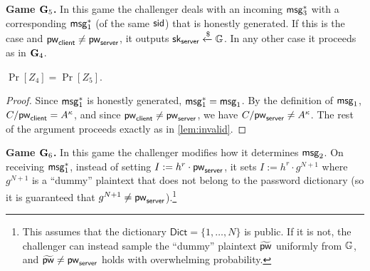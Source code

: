 \textbf{Game $\mathbf{G}_5$.} In this game the challenger deals with an incoming $\mathsf{msg}_{3}^{*}$ with a corresponding $\mathsf{msg}_{1}^{*}$ (of the same $\mathsf{sid}$) that is honestly generated. If this is the case and $\mathsf{pw}_{\mathsf{client}} \neq \mathsf{pw}_{\mathsf{server}}$, it outputs $\mathsf{sk}_{\mathsf{server}}\xleftarrow{\$}\mathbb{G}$. In any other case it proceeds as in $\mathbf{G}_4$.

\begin{lemma}
	$\Pr[Z_4]=\Pr[Z_5]$.
\end{lemma}
\begin{proof}
Since $\mathsf{msg}_{1}^*$ is honestly generated, $\mathsf{msg}_{1}^* = \mathsf{msg}_{1}$. By the definition of $\mathsf{msg}_{1}$, $C/\mathsf{pw}_{\mathsf{client}} = A^\kappa$, and since $\mathsf{pw}_{\mathsf{client}} \neq \mathsf{pw}_{\mathsf{server}}$, we have $C/\mathsf{pw}_{\mathsf{server}} \neq A^\kappa$. The rest of the argument proceeds exactly as in \cref{lem:invalid}. 
\end{proof}

\textbf{Game $\mathbf{G}_6$.} In this game the challenger modifies how it determines $\mathsf{msg}_{2}$. On receiving $\mathsf{msg}_{1}^{*}$, instead of setting $I:=h^r\cdot \mathsf{pw}_{\mathsf{server}}$, it sets $I:=h^r\cdot g^{N+1}$ where $g^{N+1}$ is a ``dummy'' plaintext that does not belong to the password dictionary (so it is guaranteed that $g^{N+1} \neq \mathsf{pw}_{\mathsf{server}}$).\footnote{This assumes that the dictionary $\mathsf{Dict} = \{1,\dots,N\}$ is public. If it is not, the challenger can instead sample the ``dummy'' plaintext $\widetilde{\mathsf{pw}}$ uniformly from $\mathbb{G}$, and $\widetilde{\mathsf{pw}} \neq \mathsf{pw}_{\mathsf{server}}$ holds with overwhelming probability.}

